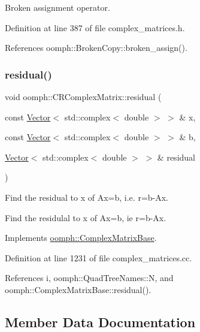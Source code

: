 Broken assignment operator. 



Definition at line 387 of file complex\+\_\+matrices.\+h.



References oomph\+::\+Broken\+Copy\+::broken\+\_\+assign().

\mbox{\label{classoomph_1_1CRComplexMatrix_ae117c59a8e27c2e909338847044a2968}} 
\subsubsection{\texorpdfstring{residual()}{residual()}}
{\footnotesize\ttfamily void oomph\+::\+C\+R\+Complex\+Matrix\+::residual (\begin{DoxyParamCaption}\item[{const \hyperlink{classoomph_1_1Vector}{Vector}$<$ std\+::complex$<$ double $>$ $>$ \&}]{x,  }\item[{const \hyperlink{classoomph_1_1Vector}{Vector}$<$ std\+::complex$<$ double $>$ $>$ \&}]{b,  }\item[{\hyperlink{classoomph_1_1Vector}{Vector}$<$ std\+::complex$<$ double $>$ $>$ \&}]{residual }\end{DoxyParamCaption})\hspace{0.3cm}{\ttfamily [virtual]}}



Find the residual to x of Ax=b, i.\+e. r=b-\/\+Ax. 

Find the residulal to x of Ax=b, ie r=b-\/\+Ax. 

Implements \hyperlink{classoomph_1_1ComplexMatrixBase_aec72875402b9ba387e0724d6c2597430}{oomph\+::\+Complex\+Matrix\+Base}.



Definition at line 1231 of file complex\+\_\+matrices.\+cc.



References i, oomph\+::\+Quad\+Tree\+Names\+::N, and oomph\+::\+Complex\+Matrix\+Base\+::residual().



\subsection{Member Data Documentation}
\mbox{\label{classoomph_1_1CRComplexMatrix_a4dc4a461836579a54010e49b0061ac6e}} 
